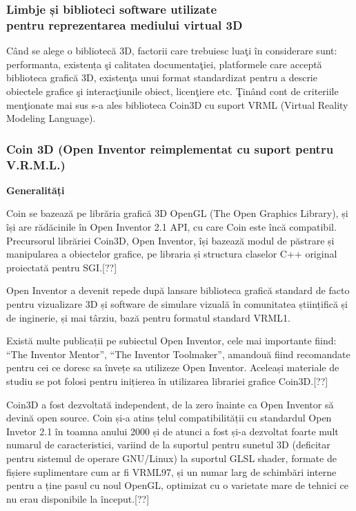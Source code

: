 \subsubsection{Limbje și biblioteci software utilizate \\ pentru reprezentarea mediului virtual 3D}

\par Când se alege o bibliotecă 3D, factorii care trebuiesc luaţi în considerare sunt: performanta,
existența şi calitatea documentaţiei, platformele care acceptă biblioteca grafică 3D, existenţa unui
format standardizat pentru a descrie obiectele grafice şi interacţiunile obiect, licenţiere etc. Ţinând cont de criteriile menţionate mai sus s-a ales biblioteca Coin3D cu suport VRML (Virtual Reality Modeling
Language). 

\subsubsection{Coin 3D (Open Inventor reimplementat cu suport pentru V.R.M.L.)}
\par \textbf{Generalități}
\par Coin se bazează pe librăria grafică 3D OpenGL (The Open Graphics Library), și își are rădăcinile în Open Inventor 2.1 API, cu care Coin este încă compatibil. Precursorul librăriei Coin3D, Open Inventor, își bazează modul de păstrare și manipularea a obiectelor grafice, pe libraria și structura claselor C++ original proiectată pentru SGI.[??]
\par Open Inventor a devenit repede după lansare biblioteca grafică standard de facto pentru vizualizare 3D și software de simulare vizuală în comunitatea științifică și de inginerie, și mai târziu, bază pentru formatul standard VRML1. 
\par Există multe publicații pe subiectul Open Inventor, cele mai importante fiind: “The Inventor Mentor”, “The Inventor Toolmaker”, amandouă fiind recomandate pentru cei ce doresc sa învețe sa utilizeze Open Inventor. Aceleași materiale de studiu se pot folosi pentru inițierea în utilizarea librariei grafice Coin3D.[??]
\par Coin3D a fost dezvoltată independent, de la zero înainte ca Open Inventor să devină open source. Coin și-a atins țelul compatibilității cu standardul Open Invetor 2.1 în toamna anului 2000 și de atunci a fost și-a dezvoltat foarte mult numarul de caracteristici, variind de la suportul pentru sunetul 3D (deficitar pentru sistemul de operare GNU/Linux) la suportul GLSL shader, formate de fișiere suplimentare cum ar fi VRML97, și un numar larg de schimbări interne pentru a ține pasul cu noul OpenGL, optimizat cu o varietate mare de tehnici ce nu erau disponibile la început.[??] 
